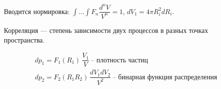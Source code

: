\begin{lecture}
\begin{lecSection}
		Вводится нормировка: $ \int \dots \int F_n \dfrac{d^n V}{V^n} = 1 $, $ dV_1 = 4\pi R_i^2 dR_i $.
		
		Корреляция --- степень зависимости двух процессов в разных точках пространства.
		
		\begin{gather*}
			d p_1 = F_1 (R_1) \,\dfrac{V_1}{V} ~ \text{-- плотность частиц} \\
			d p_2 = F_2 (R_1 R_2) \,\dfrac{dV_1 dV_2}{V^2} ~ \text{-- бинарная функция распределения}
		\end{gather*}
	\end{lecSection}
\end{lecture}